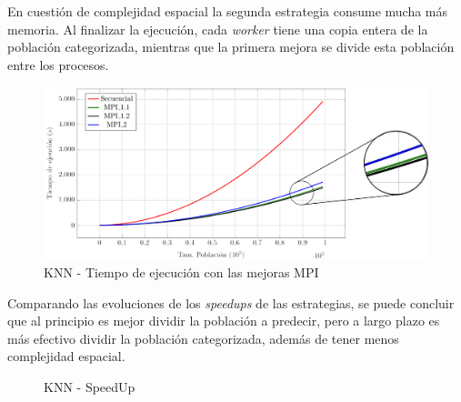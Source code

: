 			En cuestión de complejidad espacial la segunda estrategia consume mucha más memoria. Al finalizar la ejecución, cada \textit{worker} tiene una copia entera de la población categorizada, mientras que la primera mejora se divide esta población entre los procesos. 
			

			\begin{figure}[!h]
				\centering
				\includegraphics[width=1\textwidth]{images/chapter_4/knn_mpi}
				\caption{KNN - Tiempo de ejecución con las mejoras MPI}
				\label{fig:knn_ordenador}
			\end{figure}
			
			
			Comparando las evoluciones de los \textit{speedups} de las estrategias, se puede concluir que al principio es mejor dividir la población a predecir, pero a largo plazo es más efectivo dividir la población categorizada, además de tener menos complejidad espacial. 
		
			\begin{figure} [!h]
				\centering
				\caption{KNN - SpeedUp}
			\end{figure}
			
